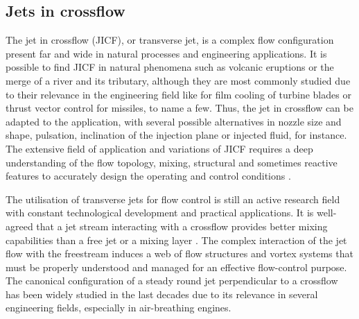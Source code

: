 \subsection{Jets in crossflow}\label{ss:JICF}

The jet in crossflow (JICF), or transverse jet, is a complex flow configuration present far and wide in natural processes and engineering applications. It is possible to find JICF in natural phenomena such as volcanic eruptions or the merge of a river and its tributary, although they are most commonly studied due to their relevance in the engineering field like for film cooling of turbine blades or thrust vector control for missiles, to name a few. Thus, the jet in crossflow can be adapted to the application, with several possible alternatives in nozzle size and shape, pulsation, inclination of the injection plane or injected fluid, for instance. The extensive field of application and variations of JICF requires a deep understanding of the flow topology, mixing, structural and sometimes reactive features to accurately design the operating and control conditions \citep{Karagozian2014revJICF}.

The utilisation of transverse jets for flow control is still an active research field with constant technological development and practical applications. It is well-agreed that a jet stream interacting with a crossflow provides better mixing capabilities than a free jet or a mixing layer \citep{kamotani1972experiments, broadwell1984structure}. The complex interaction of the jet flow with the freestream induces a web of flow structures and vortex systems that must be properly understood and managed for an effective flow-control purpose. The canonical configuration of a steady round jet perpendicular to a crossflow has been widely studied in the last decades \citep{kamotani1972experiments, fric_roshko_1994, kelso1996experimental, broadwell1984structure, smith1998mixing} due to its relevance in several engineering fields, especially in air-breathing engines. 

